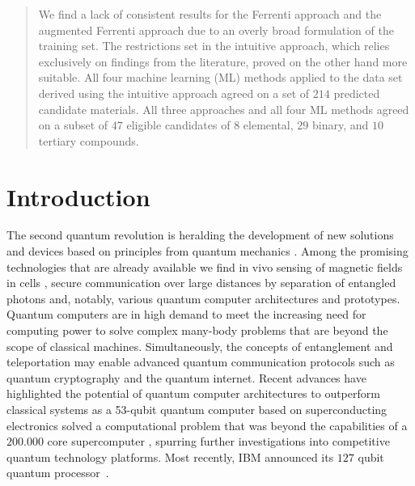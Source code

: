 \documentclass[superscriptaddress,unsortedaddress,
 amsmath,amssymb,
 aps,
]{revtex4-2}
\begin{document}
\begin{abstract}
We find a lack of consistent results for the Ferrenti approach and the augmented Ferrenti approach due to an overly broad formulation of the training set. The restrictions set in the intuitive approach, which relies exclusively on findings from the literature, proved on the other hand more suitable.  
All four machine learning (ML) methods applied to the data set derived using the intuitive approach agreed on a set of $214$ predicted candidate materials.   
All three approaches and all four ML methods agreed on a subset of $47$ eligible candidates %
of $8$ elemental, $29$ binary, and $10$ tertiary compounds.

\end{abstract}



\maketitle

\section*{Introduction}
The second quantum revolution is heralding the development of new solutions and devices based on principles from quantum mechanics \cite{Acin2018}. Among the promising technologies that are already available we find in vivo sensing of magnetic fields in cells \cite{Lesage_2013}, secure communication over large distances by separation of entangled photons \cite{Ursin2007} and, notably, various quantum computer architectures and prototypes. 
Quantum computers are in high demand to meet the increasing need for computing power to solve complex many-body problems that are beyond the scope of classical machines.   
Simultaneously, the concepts of entanglement and teleportation may enable advanced quantum communication protocols such as quantum cryptography and the quantum internet.  
Recent advances have highlighted the potential of quantum computer architectures to outperform classical systems as a 53-qubit quantum computer based on superconducting electronics solved a computational problem that was beyond the capabilities of a $200.000$ core supercomputer \cite{Arute_2019}, spurring further investigations into competitive quantum technology platforms. Most recently, IBM announced its $127$ qubit quantum processor~\cite{IBM2021}.
\end{document}
